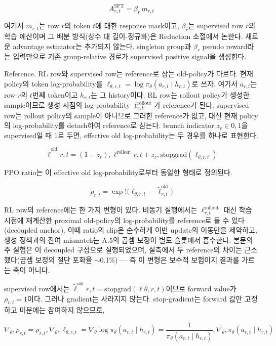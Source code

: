 $$A^{\mathrm{SFT}}_{r,t} = \beta_r\, m_{r,t}$$

여기서 $m_{r,t}$는 row $r$의 token $t$에 대한 response mask이고, $\beta_r$는 supervised row $r$의 학습 예산이며 그 배분 방식(상수 대 길이-정규화)은 Reduction 소절에서 논한다. 새로운 advantage estimator는 추가되지 않는다. singleton group과 $\beta_r$ pseudo reward라는 입력만으로 기존 group-relative 경로가 supervised positive signal을 생성한다.

Reference. RL row와 supervised row는 reference로 삼는 old-policy가 다르다. 현재 policy의 token log-probability를 $\ell_{\theta,r,t} = \log \pi_\theta(a_{r,t} \mid h_{r,t})$로 쓰자. 여기서 $a_{r,t}$는 row $r$의 $t$번째 token이고 $h_{r,t}$는 그 history이다. RL row는 rollout policy가 생성한 sample이므로 생성 시점의 log-probability $\ell^{\mathrm{rollout}}_{r,t}$가 reference가 된다. supervised row는 rollout policy의 sample이 아니므로 그러한 reference가 없고, 대신 현재 policy의 log-probability를 detach하여 reference로 삼는다. branch indicator $z_r \in {0,1}$을 supervised일 때 1로 두면, effective old log-probability는 두 경우를 하나로 표현한다.

$$\tilde{\ell}^{\mathrm{old}}{r,t} = (1 - z_r),\ell^{\mathrm{rollout}}{r,t} + z_r,\mathrm{stopgrad}(\ell_{\theta,r,t})$$

PPO ratio는 이 effective old log-probability로부터 동일한 형태로 정의된다.

$$\rho_{r,t} = \exp!\big(\ell_{\theta,r,t} - \tilde{\ell}^{\mathrm{old}}_{r,t}\big)$$

RL row의 reference에는 한 가지 변형이 있다. 비동기 실행에서는 $\ell^{\mathrm{rollout}}_{r,t}$ 대신 학습 시점에 재계산한 proximal old-policy의 log-probability를 reference로 둘 수 있다(decoupled anchor). 이때 ratio의 clip은 순수하게 이번 update의 이동만을 제약하고, 생성 정책과의 잔여 mismatch는 A.5의 곱셈 보정이 별도 슬롯에서 흡수한다. 본문의 주 실험은 이 decoupled 구성으로 실행되었으며, 실측에서 두 reference의 차이는 근소했다(곱셈 보정의 절단 포화율 $\sim$0.1\%) — 즉 이 변형은 보수적 보험이지 결과를 가르는 축이 아니다.

supervised row에서는 $\tilde{\ell}^{\mathrm{old}}{r,t} = \mathrm{stopgrad}(\ell{\theta,r,t})$이므로 forward value가 $\rho_{r,t} = 1$이다. 그러나 gradient는 사라지지 않는다. stop-gradient는 forward 값만 고정하고 미분에는 참여하지 않으므로,

$$\nabla_\theta, \rho_{r,t} = \rho_{r,t},\nabla_\theta, \ell_{\theta,r,t} = \nabla_\theta \log \pi_\theta(a_{r,t} \mid h_{r,t}) = \frac{1}{\pi_\theta(a_{r,t} \mid h_{r,t})},\nabla_\theta, \pi_\theta(a_{r,t} \mid h_{r,t})$$

